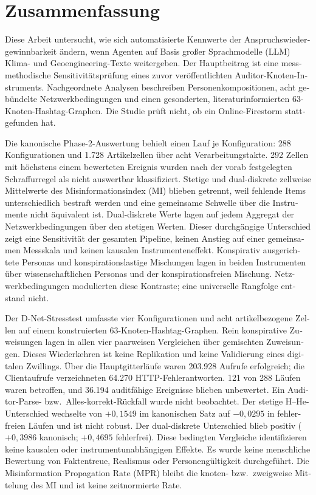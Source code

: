 \documentclass[
  11pt,a4paper,twoside,openright,
  bibliography=totoc,listof=totoc,
  captions=tableheading,headings=normal,numbers=noenddot
]{scrbook}
\begin{document}
\chapter*{Zusammenfassung}
\begin{otherlanguage}{ngerman}
Diese Arbeit untersucht, wie sich automatisierte Kennwerte der
Anspruchswiedergewinnbarkeit ändern, wenn Agenten auf Basis großer
Sprachmodelle (LLM) Klima- und Geoengineering-Texte weitergeben.
Der Hauptbeitrag ist eine messmethodische Sensitivitätsprüfung eines zuvor
veröffentlichten Auditor-Knoten-Instruments.
Nachgeordnete Analysen beschreiben Personenkompositionen, acht gebündelte
Netzwerkbedingungen und einen gesonderten, literaturinformierten
63-Knoten-Hashtag-Graphen.
Die Studie prüft nicht, ob ein Online-Firestorm stattgefunden hat.

Die kanonische Phase-2-Auswertung behielt einen Lauf je Konfiguration:
288 Konfigurationen und 1.728 Artikelzellen über acht Verarbeitungstakte.
292 Zellen mit höchstens einem bewerteten Ereignis wurden nach der
vorab festgelegten Schraffurregel als nicht auswertbar klassifiziert.
Stetige und dual-diskrete zellweise Mittelwerte des Misinformationsindex
(MI) blieben getrennt, weil fehlende Items unterschiedlich bestraft werden
und eine gemeinsame Schwelle über die Instrumente nicht äquivalent ist.
Dual-diskrete Werte lagen auf jedem Aggregat der Netzwerkbedingungen über
den stetigen Werten.
Dieser durchgängige Unterschied zeigt eine Sensitivität der gesamten
Pipeline, keinen Anstieg auf einer gemeinsamen Messskala und keinen
kausalen Instrumenteneffekt.
Konspirativ ausgerichtete Personas und konspirationslastige Mischungen
lagen in beiden Instrumenten über wissenschaftlichen Personas und der
konspirationsfreien Mischung.
Netzwerkbedingungen modulierten diese Kontraste; eine universelle Rangfolge
entstand nicht.

Der D-Net-Stresstest umfasste vier Konfigurationen und acht artikelbezogene
Zellen auf einem konstruierten 63-Knoten-Hashtag-Graphen.
Rein konspirative Zuweisungen lagen in allen vier paarweisen Vergleichen
über gemischten Zuweisungen.
Dieses Wiederkehren ist keine Replikation und keine Validierung eines
digitalen Zwillings.
Über die Hauptgitterläufe waren 203.928 Aufrufe erfolgreich; die
Clientaufrufe verzeichneten 64.270 HTTP-Fehlerantworten.
121 von 288 Läufen waren betroffen, und 36.194 auditfähige Ereignisse
blieben unbewertet.
Ein Auditor-Parse- bzw.\ Alles-korrekt-Rückfall wurde nicht beobachtet.
Der stetige H--He-Unterschied wechselte von \(+0{,}1549\) im kanonischen
Satz auf \(-0{,}0295\) in fehlerfreien Läufen und ist nicht robust.
Der dual-diskrete Unterschied blieb positiv (\( +0{,}3986 \) kanonisch;
\( +0{,}4695 \) fehlerfrei).
Diese bedingten Vergleiche identifizieren keine kausalen oder
instrumentunabhängigen Effekte.
Es wurde keine menschliche Bewertung von Faktentreue, Realismus oder
Personengültigkeit durchgeführt.
Die Misinformation Propagation Rate (MPR) bleibt die knoten- bzw.\
zweigweise Mittelung des MI und ist keine zeitnormierte Rate.
\end{otherlanguage}
\end{document}
